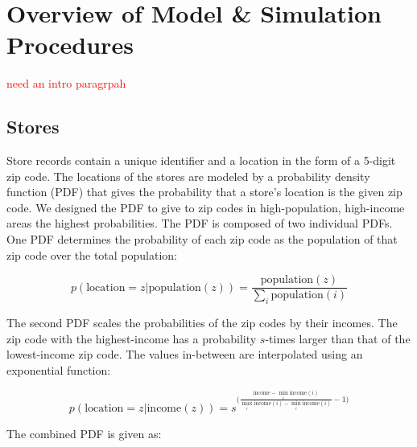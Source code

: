\documentclass[conference]{IEEEtran}
\begin{document}

\section{Overview of Model \& Simulation Procedures}

\textcolor{red}{need an intro paragrpah}

\subsection{Stores}


Store records contain a unique identifier and a location in the form of a 5-digit zip code.  The locations of the stores are modeled by a probability density function (PDF) that gives the probability that a store's location is the given zip code. We designed the PDF to give to zip codes in high-population, high-income areas the highest probabilities. The PDF is composed of two individual PDFs. One PDF determines the probability of each zip code as the population of that zip code over the total population:

\begin{equation}
p(\text{location}=z | \text{population}(z)) = \frac{\text{population}(z)}{\sum_{i} \text{population}(i)}
\end{equation}

The second PDF scales the probabilities of the zip codes by their incomes.  The zip code with the highest-income has a probability $s$-times larger than that of the lowest-income zip code. The values in-between are interpolated using an exponential function:


\begin{equation}
p(\text{location}=z | \text{income}(z)) = s ^ {\big( \frac{\text{income} - \min_i{\textrm{income}(i)}} {\max_i{\textrm{income}(i)} - \min_i{\textrm{income}(i)}} - 1 \big)}
\end{equation}

The combined PDF is given as: 
\end{document}
